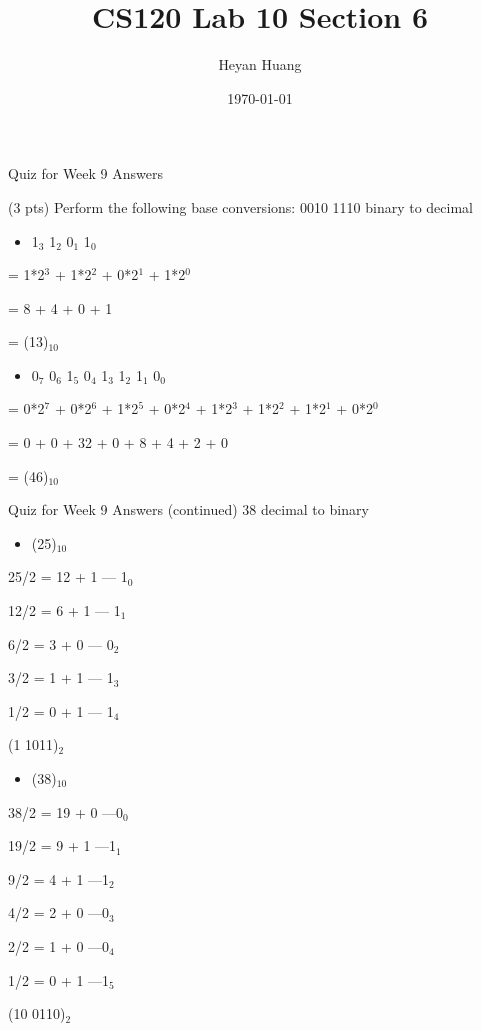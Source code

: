 \documentclass[presentation]{beamer}
\author{Heyan Huang}
\date{\today}
\title{CS120 Lab \alert{10} Section \alert{6}}
\begin{document}
\maketitle

\begin{frame}[label=sec-1]{Quiz for Week 9 \alert{Answers}}
\begin{block}{(3 pts) Perform the following base conversions:}
0010 1110 binary to decimal
\begin{itemize}
\item 1$_{\text{3}}$ 1$_{\text{2}}$ 0$_{\text{1}}$ 1$_{\text{0}}$
\end{itemize}

= 1*2$^{\text{3}}$ + 1*2$^{\text{2}}$ + 0*2$^{\text{1}}$ + 1*2$^{\text{0}}$

= 8 + 4 + 0 + 1 

= (13)$_{\text{10}}$
\\
\begin{itemize}
\item 0$_{\text{7}}$ 0$_{\text{6}}$ 1$_{\text{5}}$ 0$_{\text{4}}$  1$_{\text{3}}$ 1$_{\text{2}}$ 1$_{\text{1}}$ 0$_{\text{0}}$
\end{itemize}

= 0*2$^{\text{7}}$ + 0*2$^{\text{6}}$ + 1*2$^{\text{5}}$ + 0*2$^{\text{4}}$ + 1*2$^{\text{3}}$ + 1*2$^{\text{2}}$ + 1*2$^{\text{1}}$ + 0*2$^{\text{0}}$

= 0 + 0 + 32 + 0 + 8 + 4 + 2 + 0

= (46)$_{\text{10}}$
\end{block}
\end{frame}

\begin{frame}[label=sec-2]{Quiz for Week 9 \alert{Answers} (continued)}
38 decimal to binary
\begin{itemize}
\item (25)$_{\text{10}}$
\end{itemize}
25/2 = 12 + \alert{1}  --- 1$_{\text{0}}$

12/2 = 6 + \alert{1}   --- 1$_{\text{1}}$

6/2 = 3 + \alert{0}    --- 0$_{\text{2}}$

3/2 = 1 + \alert{1}    --- 1$_{\text{3}}$

1/2 = 0 + \alert{1}    --- 1$_{\text{4}}$

(1 1011)$_{\text{2}}$
\begin{itemize}
\item (38)$_{\text{10}}$
\end{itemize}
38/2 = 19 + \alert{0}  ---0$_{\text{0}}$

19/2 = 9 + \alert{1}   ---1$_{\text{1}}$

9/2 = 4 + \alert{1}    ---1$_{\text{2}}$

4/2 = 2 + \alert{0}    ---0$_{\text{3}}$

2/2 = 1 + \alert{0}    ---0$_{\text{4}}$

1/2 = 0 + \alert{1}    ---1$_{\text{5}}$

(10 0110)$_{\text{2}}$
\end{frame}
\end{document}
